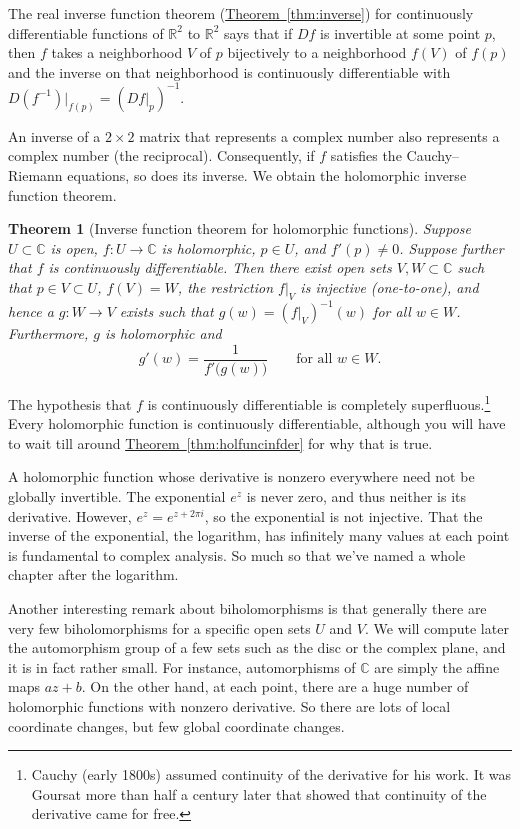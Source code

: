 \documentclass[12pt,openany]{book}
\newcommand{\C}{{\mathbb{C}}}
\newcommand{\R}{{\mathbb{R}}}
\theoremstyle{plain}
\newtheorem{thm}{Theorem}[section]
\theoremstyle{remark}
\theoremstyle{definition}
\theoremstyle{exercise}
\theoremstyle{example}
\newcommand{\thmref}[1]{\hyperref[#1]{Theorem~\ref*{#1}}}
\begin{document}
The real inverse function theorem (\thmref{thm:inverse})
for continuously differentiable
functions of $\R^2$ to $\R^2$
says that if $Df$ is invertible at some point $p$, then $f$ takes a
neighborhood $V$ of $p$ bijectively to a neighborhood $f(V)$
of $f(p)$ and the inverse on that neighborhood is continuously
differentiable with $D(f^{-1})|_{f(p)} = (Df|_p)^{-1}$.

An inverse of a $2 \times 2$ matrix that represents a complex number also
represents a complex number (the reciprocal).  Consequently, if $f$
satisfies the Cauchy--Riemann equations, so does its inverse.
We obtain the holomorphic inverse function theorem.

\begin{thm}[Inverse function theorem for holomorphic functions]
\label{thm:inversehol}
Suppose $U \subset \C$ is open, $f \colon U \to \C$ is holomorphic,
$p \in U$, and $f'(p) \not= 0$.  Suppose further that $f$ is continuously
differentiable.
Then there exist open sets $V, W \subset \C$ such that
$p \in V \subset U$, $f(V) = W$, the restriction $f|_V$ is injective
(one-to-one),
and hence a $g \colon W \to V$ exists such that
$g(w) = (f|_V)^{-1}(w)$ for all $w \in W$.
Furthermore, $g$ is holomorphic and
\begin{equation*}
g'(w) = \frac{1}{f'\bigl(g(w)\bigr)} \qquad \text{for all $w \in W$}.
\end{equation*}
\end{thm}

The hypothesis that $f$ is continuously differentiable is completely
superfluous.\footnote{Cauchy (early 1800s)
assumed continuity of the derivative for his work.
It was Goursat more than half a century later that showed that continuity of the
derivative came for free.}
Every holomorphic function is continuously
differentiable, although you will have to wait till around
\thmref{thm:holfuncinfder} for why that is true.

A holomorphic function whose derivative is nonzero
everywhere need not be globally invertible.  The exponential $e^z$
is never zero, and thus neither is its derivative.  However, $e^{z} = e^{z+2\pi i}$,
so the
exponential is not injective.
That the inverse of the
exponential, the logarithm,
has infinitely many values at each point is fundamental to complex analysis.
So much so that we've named a whole chapter after the logarithm.

Another interesting remark about biholomorphisms is that generally
there are very few biholomorphisms for a specific open sets $U$ and $V$.  We will
compute later the automorphism group of a few sets such as the disc or the
complex plane, and it is in fact rather small.
For instance, automorphisms of $\C$ are simply the affine maps $a
z + b$.  On the other hand, at each point, there are a huge number of
holomorphic functions with nonzero derivative.  So there are lots of local
coordinate changes, but few global coordinate changes.
\end{document}
